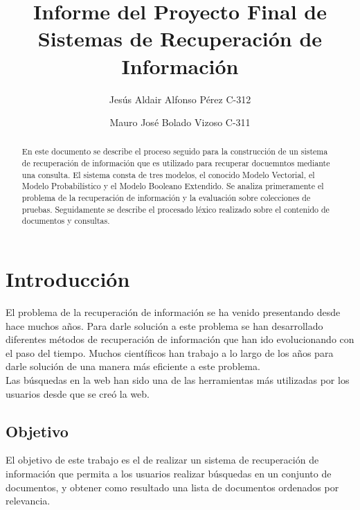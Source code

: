 \documentclass{llncs}
\begin{document}
	
	
\title{Informe del Proyecto Final de Sistemas de Recuperaci\'on de Informaci\'on}
\author{Jes\'us Aldair Alfonso P\'erez C-312 \and Mauro Jos\'e Bolado Vizoso C-311}


\maketitle

\begin{abstract}
	
	En este documento se describe el proceso seguido para la construcción de un sistema de recuperación de información que es utilizado para recuperar docuemntos mediante una consulta. El sistema consta de tres modelos, el conocido Modelo Vectorial, el Modelo Probabil\'istico y el Modelo Booleano Extendido. Se analiza primeramente el problema de la recuperación de información y la  evaluación sobre colecciones de pruebas. Seguidamente se describe el procesado léxico realizado sobre el contenido de documentos y consultas.
	
\end{abstract}

\section{Introducci\'on}

El problema de la recuperaci\'on de informaci\'on se ha venido presentando desde hace muchos a\~nos. Para darle soluci\'on a este problema se han desarrollado diferentes m\'etodos de recuperaci\'on de informaci\'on que han ido evolucionando con el paso del tiempo. Muchos cient\'ificos han trabajo a lo largo de los a\~nos para darle soluci\'on de una manera m\'as eficiente a este problema.\\

Las b\'usquedas en la web han sido una de las herramientas m\'as utilizadas por los usuarios desde que se cre\'o la web.\\

\subsection{Objetivo}
	El objetivo de este trabajo es el de realizar un sistema de recuperaci\'on de informaci\'on 
	que permita a los usuarios realizar b\'usquedas en un conjunto de documentos, 
	y obtener como resultado una lista de documentos ordenados por relevancia.\\
\end{document}
